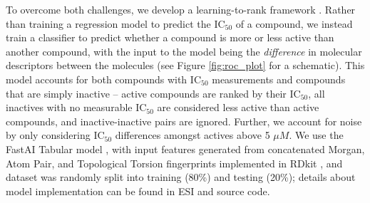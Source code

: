 To overcome both challenges, we develop a learning-to-rank framework \cite{duffy2010molecular,agarwal2010ranking}. Rather than training a regression model to predict the $\mathrm{IC}_{50}$ of a compound, we instead train a classifier to predict whether a compound is more or less active than another compound, with the input to the model being the \emph{difference} in molecular descriptors between the molecules (see Figure \ref{fig:roc_plot} for a schematic). This model accounts for both compounds with $\mathrm{IC}_{50}$ measurements and compounds that are simply inactive -- active compounds are ranked by their $\mathrm{IC}_{50}$, all inactives with no measurable $\mathrm{IC}_{50}$ are considered less active than active compounds, and inactive-inactive pairs are ignored. Further, we account for noise by only considering $\mathrm{IC}_{50}$ differences amongst actives above 5 $\mu M$. We use the FastAI Tabular model \cite{howard2018fastai}, with input features generated from concatenated Morgan, Atom Pair, and Topological Torsion fingerprints implemented in RDkit \cite{rdkit}, and dataset was randomly split into training (80\%) and testing (20\%); details about model implementation can be found in ESI and source code.




